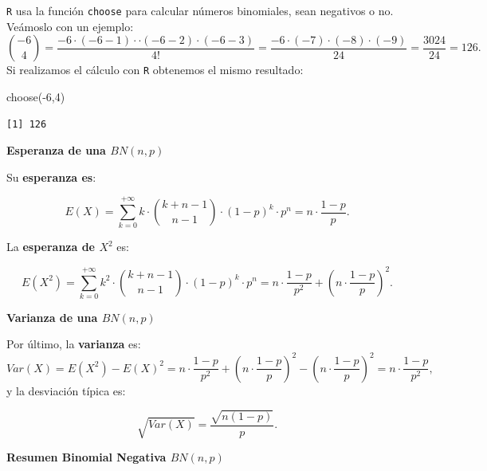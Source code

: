 \documentclass[
  letterpaper,
  DIV=11,
  numbers=noendperiod]{scrreprt}
\newenvironment{Shaded}{\begin{snugshade}}{\end{snugshade}}
\newcommand{\DecValTok}[1]{\textcolor[rgb]{0.68,0.00,0.00}{#1}}
\newcommand{\FunctionTok}[1]{\textcolor[rgb]{0.28,0.35,0.67}{#1}}
\newcommand{\NormalTok}[1]{\textcolor[rgb]{0.00,0.23,0.31}{#1}}
\newcommand{\SpecialCharTok}[1]{\textcolor[rgb]{0.37,0.37,0.37}{#1}}
\begin{document}
\texttt{R} usa la función \texttt{choose} para calcular números
binomiales, sean negativos o no. Veámoslo con un ejemplo: \[
{-6\choose 4}=\frac{-6\cdot (-6-1)\cdot \cdot (-6-2)\cdot (-6-3) }{4!}= \frac{-6\cdot(-7)\cdot (-8)\cdot (-9)}{24}
= \frac{3024}{24}=126.
\] Si realizamos el cálculo con \texttt{R} obtenemos el mismo resultado:

\begin{Shaded}
\begin{Highlighting}[]
\FunctionTok{choose}\NormalTok{(}\SpecialCharTok{{-}}\DecValTok{6}\NormalTok{,}\DecValTok{4}\NormalTok{)}
\end{Highlighting}
\end{Shaded}

\begin{verbatim}
[1] 126
\end{verbatim}

\textbf{Esperanza de una \(BN(n,p)\)}

Su \textbf{esperanza es}:

\[E(X)=\sum_{k=0}^{+\infty} k\cdot {k+n-1\choose n-1} \cdot (1-p)^{k}\cdot p^n=n\cdot\frac{1-p}{p}.\]

La \textbf{esperanza de \(X^2\)} es:

\[E(X^2)=\sum_{k=0}^{+\infty} k^2\cdot {k+n-1\choose n-1} \cdot (1-p)^{k}\cdot p^n=n\cdot\frac{1-p}{p^2}+\left(n\cdot \frac{1-p}{p}\right)^2.\]

\textbf{Varianza de una \(BN(n,p)\)}

Por último, la \textbf{varianza} es: \[
Var(X)=E(X^2)-E(X)^2=n\cdot \frac{1-p}{p^2}+\left(n\cdot \frac{1-p}{p}\right)^2-\left(n\cdot \frac{1-p}{p}\right)^2=
n\cdot \frac{1-p}{p^2},
\] y la desviación típica es:

\[\sqrt{Var(X)} = \frac{\sqrt{n(1-p)}}{p}.\]

\textbf{Resumen Binomial Negativa \(BN(n,p)\)}
\end{document}
